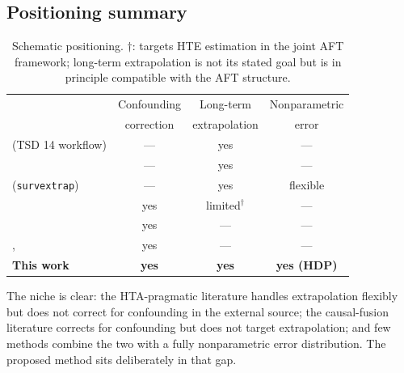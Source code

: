 \documentclass[11pt]{article}
\begin{document}
\subsection{Positioning summary}

\begin{table}[h]
\centering\small
\begin{tabular}{lccc}
\toprule
& Confounding & Long-term      & Nonparametric \\
& correction  & extrapolation  & error         \\
\midrule
\citet{Latimer2013} (TSD 14 workflow)        & --- & yes & ---  \\
\citet{Guyot2017}                            & --- & yes & ---  \\
\citet{Jackson2023} (\texttt{survextrap})    & --- & yes & flexible \\
\citet{Ye2025}                               & yes & limited$^\dagger$ & --- \\
\citet{YangLiuZengWang2025}                  & yes & ---       & --- \\
\citet{Kallus2018}, \citet{Yao2024}          & yes & ---       & --- \\
\textbf{This work}                           & \textbf{yes} & \textbf{yes} & \textbf{yes (HDP)} \\
\bottomrule
\end{tabular}
\caption{Schematic positioning. $\dagger$: \citet{Ye2025} targets HTE
estimation in the joint AFT framework; long-term extrapolation is not its
stated goal but is in principle compatible with the AFT structure.}
\end{table}

The niche is clear: the HTA-pragmatic literature handles extrapolation
flexibly but does not correct for confounding in the external source; the
causal-fusion literature corrects for confounding but does not target
extrapolation; and few methods combine the two with a fully nonparametric
error distribution. The proposed method sits deliberately in that gap.
\end{document}
